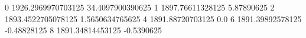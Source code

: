 0 1926.2969970703125 34.4097900390625
1 1897.76611328125 5.87890625
2 1893.4522705078125 1.5650634765625
4 1891.88720703125 0.0
6 1891.39892578125 -0.48828125
8 1891.34814453125 -0.5390625
